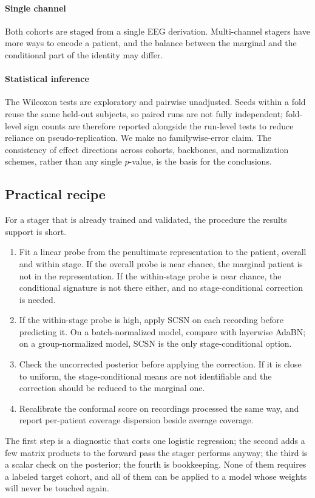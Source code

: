\paragraph{Single channel}
Both cohorts are staged from a single EEG derivation. Multi-channel stagers
have more ways to encode a patient, and the balance between the marginal and
the conditional part of the identity may differ.

\paragraph{Statistical inference}
The Wilcoxon tests are exploratory and pairwise unadjusted. Seeds within a
fold reuse the same held-out subjects, so paired runs are not fully
independent; fold-level sign counts are therefore reported alongside the
run-level tests to reduce reliance on pseudo-replication. We make no
familywise-error claim. The consistency of effect directions across cohorts,
backbones, and normalization schemes, rather than any single $p$-value, is
the basis for the conclusions.

\subsection{Practical recipe}

For a stager that is already trained and validated, the procedure the results
support is short.
\begin{enumerate}
  \item Fit a linear probe from the penultimate representation to the patient,
  overall and within stage. If the overall probe is near chance, the marginal
  patient is not in the representation. If the within-stage probe is near
  chance, the conditional signature is not there either, and no
  stage-conditional correction is needed.
  \item If the within-stage probe is high, apply SCSN on each recording before
  predicting it. On a batch-normalized model, compare with layerwise AdaBN; on
  a group-normalized model, SCSN is the only stage-conditional option.
  \item Check the uncorrected posterior before applying the correction. If it
  is close to uniform, the stage-conditional means are not identifiable and
  the correction should be reduced to the marginal one.
  \item Recalibrate the conformal score on recordings processed the same way,
  and report per-patient coverage dispersion beside average coverage.
\end{enumerate}
The first step is a diagnostic that costs one logistic regression; the second
adds a few matrix products to the forward pass the stager performs anyway; the
third is a scalar check on the posterior; the fourth is bookkeeping. None of them requires a labeled target cohort, and
all of them can be applied to a model whose weights will never be touched
again.
